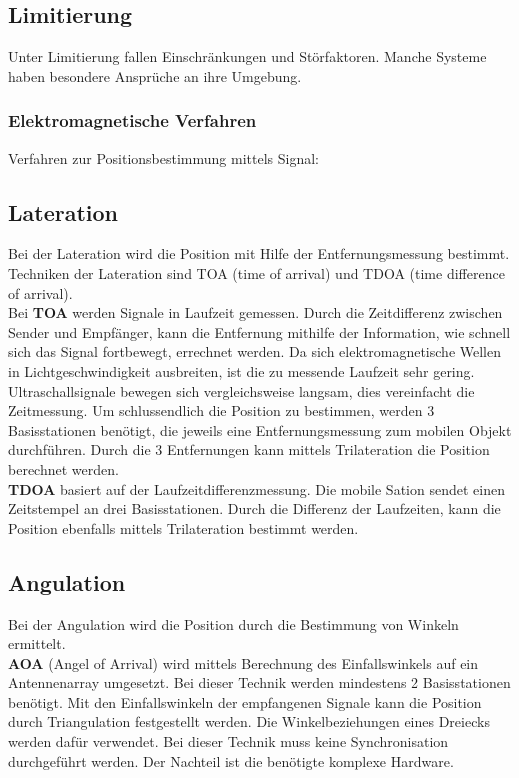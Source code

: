     \subsection*{Limitierung}
    Unter Limitierung fallen Einschränkungen und Störfaktoren. Manche Systeme haben besondere Ansprüche an ihre Umgebung.


    \subsubsection{Elektromagnetische Verfahren}

    Verfahren zur Positionsbestimmung mittels Signal: \cite{pos_signal_2} \cite{pos_signal_4}
    
    \subsection*{Lateration}
    Bei der Lateration wird die Position mit Hilfe der Entfernungsmessung bestimmt.
    Techniken der Lateration sind TOA (time of arrival) und TDOA (time difference of arrival).\\
    Bei \textbf{TOA} werden Signale in Laufzeit gemessen. Durch die Zeitdifferenz zwischen Sender und Empfänger, kann die Entfernung mithilfe der Information, wie schnell sich das Signal fortbewegt, errechnet werden. Da sich elektromagnetische Wellen in Lichtgeschwindigkeit ausbreiten, ist die zu messende Laufzeit sehr gering. Ultraschallsignale bewegen sich vergleichsweise langsam, dies vereinfacht die Zeitmessung. 
    Um schlussendlich die Position zu bestimmen, werden 3 Basisstationen benötigt, die jeweils eine Entfernungsmessung zum mobilen Objekt durchführen. Durch die 3 Entfernungen kann mittels Trilateration die Position berechnet werden.
    \\ %
    \textbf{TDOA} basiert auf der Laufzeitdifferenzmessung. 
    Die mobile Sation sendet einen Zeitstempel an drei Basisstationen. Durch die Differenz der Laufzeiten, kann die Position ebenfalls mittels Trilateration bestimmt werden.
    \\ %
    \subsection*{Angulation}
    Bei der Angulation wird die Position durch die Bestimmung von Winkeln ermittelt. \\
    \textbf{AOA} (Angel of Arrival) wird mittels Berechnung des Einfallswinkels auf ein Antennenarray umgesetzt. Bei dieser Technik werden mindestens 2 Basisstationen benötigt. Mit den Einfallswinkeln der empfangenen Signale kann die Position durch Triangulation festgestellt werden. Die Winkelbeziehungen eines Dreiecks werden dafür verwendet.
    Bei dieser Technik muss keine Synchronisation durchgeführt werden. Der Nachteil ist die benötigte komplexe Hardware. 
    \\ %
